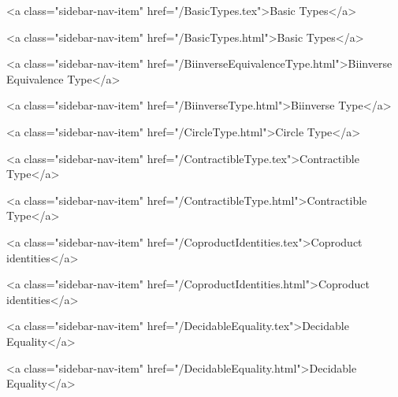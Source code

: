           <a class="sidebar-nav-item" href="/BasicTypes.tex">Basic Types</a>
        
      
    
      
        
          <a class="sidebar-nav-item" href="/BasicTypes.html">Basic Types</a>
        
      
    
      
        
          <a class="sidebar-nav-item" href="/BiinverseEquivalenceType.html">Biinverse Equivalence Type</a>
        
      
    
      
        
          <a class="sidebar-nav-item" href="/BiinverseType.html">Biinverse Type</a>
        
      
    
      
        
          <a class="sidebar-nav-item" href="/CircleType.html">Circle Type</a>
        
      
    
      
        
          <a class="sidebar-nav-item" href="/ContractibleType.tex">Contractible Type</a>
        
      
    
      
        
          <a class="sidebar-nav-item" href="/ContractibleType.html">Contractible Type</a>
        
      
    
      
        
          <a class="sidebar-nav-item" href="/CoproductIdentities.tex">Coproduct identities</a>
        
      
    
      
        
          <a class="sidebar-nav-item" href="/CoproductIdentities.html">Coproduct identities</a>
        
      
    
      
        
          <a class="sidebar-nav-item" href="/DecidableEquality.tex">Decidable Equality</a>
        
      
    
      
        
          <a class="sidebar-nav-item" href="/DecidableEquality.html">Decidable Equality</a>
        
      
    

